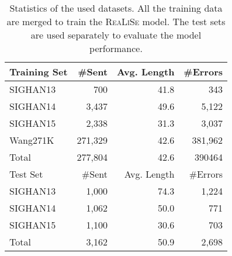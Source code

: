 \documentclass[11pt,a4paper]{article}
\newcommand\model{\textsc{ReaLiSe}}
\begin{document}
\begin{table}[t]
\small
\centering

\begin{tabular}{@{}lrrr@{}}
\toprule
Training Set & \#Sent & Avg. Length & \#Errors \\ \midrule
SIGHAN13 & 700 & 41.8 & 343 \\
SIGHAN14 & 3,437 & 49.6 & 5,122 \\
SIGHAN15 & 2,338 & 31.3 & 3,037 \\
Wang271K & 271,329 & 42.6 & 381,962 \\ \midrule
Total & 277,804 & 42.6 & 390464 \\ \midrule \midrule
Test Set & \#Sent & Avg. Length & \#Errors \\ \midrule
SIGHAN13 & 1,000 & 74.3 & 1,224 \\
SIGHAN14 & 1,062 & 50.0 & 771 \\
SIGHAN15 & 1,100 & 30.6 & 703 \\ \midrule
Total & 3,162 & 50.9 & 2,698 \\ \bottomrule
\end{tabular}

\caption{Statistics of the used datasets. All the training data are merged to train the \model{} model. The test sets are used separately to evaluate the model performance.}
\label{tab-dataset}
\end{table} 
\end{document}

